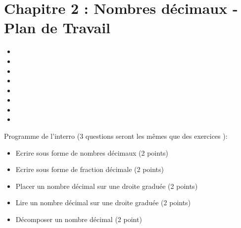 \section*{Chapitre 2 : Nombres décimaux - Plan de Travail}

{\begin{multicols}{4}
\begin{itemize}
    \itemindent=-25pt
        \item {}
        \item {}
        \item {}
        \item {}
        \item {}
        \item {}
        \item {}
        \item {}
    \end{itemize}
\end{multicols}}

\begin{plandetravailDS}
    Programme de l'interro (3 questions seront les mêmes que des exercices ):
    \begin{itemize}
        \item Ecrire sous forme de nombres décimaux (2 points)
        \item Ecrire sous forme de fraction décimale (2 points)
        \item Placer un nombre décimal sur une droite graduée (2 points)
        \item Lire un nombre décimal sur une droite graduée  (2 points)
        \item Décomposer un nombre décimal (2 point)
    \end{itemize}
\end{plandetravailDS}

